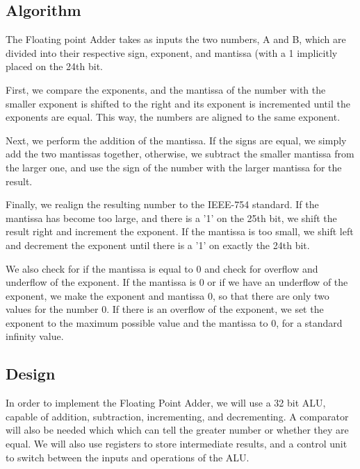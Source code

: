 \documentclass[a4paper,10pt]{article}
\begin{document}
    \subsection{Algorithm}
    The Floating point Adder takes as inputs the two numbers, A and B, which are divided into their respective sign, exponent, and mantissa (with a 1 implicitly placed on the 24th bit.

    First, we compare the exponents, and the mantissa of the number with the smaller exponent is shifted to the right and its exponent is incremented until the exponents are equal. This way, the numbers are aligned to the same exponent.

    Next, we perform the addition of the mantissa. If the signs are equal, we simply add the two mantissas together, otherwise, we subtract the smaller mantissa from the larger one, and use the sign of the number with the larger mantissa for the result.

    Finally, we realign the resulting number to the IEEE-754 standard. If the mantissa has become too large, and there is a '1' on the 25th bit, we shift the result right and increment the exponent. If the mantissa is too small, we shift left and decrement the exponent until there is a '1' on exactly the 24th bit.

    We also check for if the mantissa is equal to 0 and check for overflow and underflow of the exponent. If the mantissa is 0 or if we have an underflow of the exponent, we make the exponent and mantissa 0, so that there are only two values for the number 0. If there is an overflow of the exponent, we set the exponent to the maximum possible value and the mantissa to 0, for a standard infinity value.

    \newpage
    \subsection{Design}
    In order to implement the Floating Point Adder, we will use a 32 bit ALU, capable of addition, subtraction, incrementing, and decrementing. A comparator will also be needed which which can tell the greater number or whether they are equal. We will also use registers to store intermediate results, and a control unit to switch between the inputs and operations of the ALU.
\end{document}
